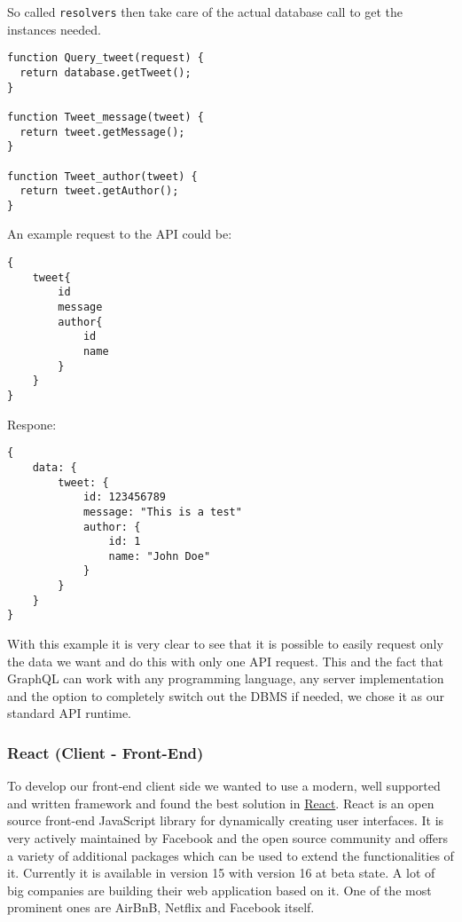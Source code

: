 \documentclass[]{article}
\begin{document}
So called \texttt{resolvers} then take care of the actual database call
to get the instances needed.

\begin{verbatim}
function Query_tweet(request) {
  return database.getTweet();
}

function Tweet_message(tweet) {
  return tweet.getMessage();
}

function Tweet_author(tweet) {
  return tweet.getAuthor();
}
\end{verbatim}

An example request to the API could be:

\begin{verbatim}
{
    tweet{
        id
        message
        author{
            id
            name
        }
    }
}    
\end{verbatim}

Respone:

\begin{verbatim}
{
    data: {
        tweet: {
            id: 123456789
            message: "This is a test"
            author: {
                id: 1
                name: "John Doe"
            }
        }
    }
}
\end{verbatim}

With this example it is very clear to see that it is possible to easily
request only the data we want and do this with only one API request.
This and the fact that GraphQL can work with any programming language,
any server implementation and the option to completely switch out the
DBMS if needed, we chose it as our standard API runtime.

\subsubsection{React (Client -
Front-End)}\label{react-client---front-end}

To develop our front-end client side we wanted to use a modern, well
supported and written framework and found the best solution in
\href{https://facebook.github.io/react/}{React}. React is an open source
front-end JavaScript library for dynamically creating user interfaces.
It is very actively maintained by Facebook and the open source community
and offers a variety of additional packages which can be used to extend
the functionalities of it. Currently it is available in version 15 with
version 16 at beta state. A lot of big companies are building their web
application based on it. One of the most prominent ones are AirBnB,
Netflix and Facebook itself.
\end{document}
